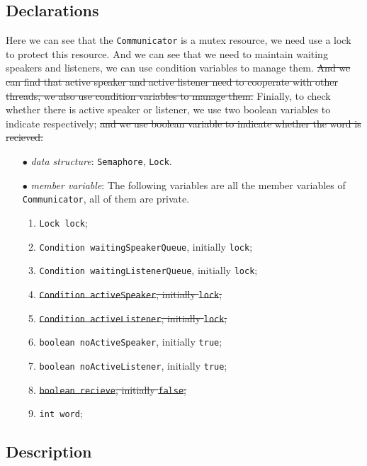\documentclass{article}
\begin{document}
\begin{spacing}{1.1}
\subsection{Declarations}
Here we can see that the \texttt{Communicator} is a mutex resource, we need use
a lock to protect this resource. And we can see that we need to maintain waiting
speakers and listeners, we can use condition variables to manage them. {\color{red}\sout{And we 
can find that active speaker and active listener need to cooperate with other
threads, we also use condition variables to manage them.}} Finially, to check whether
there is active speaker or listener, we use two boolean variables to indicate 
respectively; {\color{red}\sout{and we use boolean variable to indicate whether the word is recieved.}}
\begin{enumerate}
  \item[$\bullet$] \textit{data structure}: \texttt{Semaphore}, \texttt{Lock}.
  \item[$\bullet$] \textit{member variable}:
    The following variables are all the member variables of \texttt{Communicator},
    all of them are private. 
    \begin{enumerate}
      \item \texttt{Lock lock};
      \item \texttt{Condition waitingSpeakerQueue}, initially \texttt{lock};
      \item \texttt{Condition waitingListenerQueue}, initially \texttt{lock};
      \item {\color{red}\sout{\texttt{Condition activeSpeaker}, initially \texttt{lock};}}
      \item {\color{red}\sout{\texttt{Condition activeListener}, initially \texttt{lock};}}
      \item \texttt{boolean noActiveSpeaker}, initially \texttt{true};
      \item \texttt{boolean noActiveListener}, initially \texttt{true};
      \item {\color{red}\sout{\texttt{boolean recieve}, initially \texttt{false};}}
      \item \texttt{int word};
    \end{enumerate}
\end{enumerate}

\subsection{Description}


\end{spacing}
\end{document}
